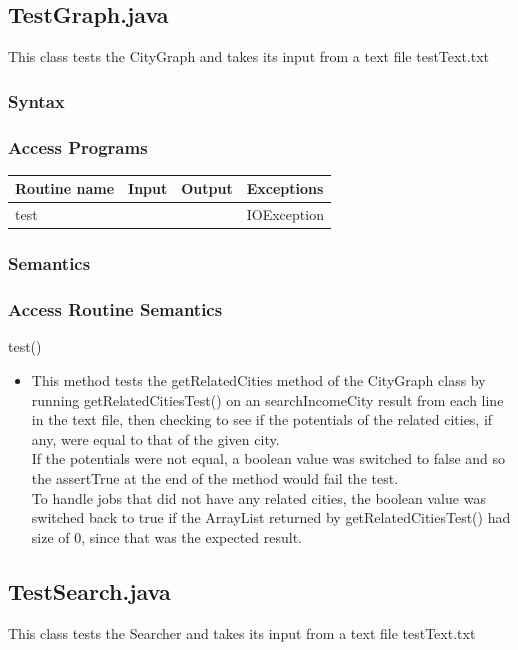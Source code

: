 \documentclass[12pt,fleqn]{article}
\begin{document}
\subsection*{TestGraph.java}\label{testg}
This class tests the CityGraph and takes its input from a text file testText.txt
\subsubsection* {Syntax}

\subsubsection* {Access Programs}
\begin{tabular}{| l | l | l | l |}
\hline
\textbf{Routine name} & \textbf{Input} & \textbf{Output} & \textbf{Exceptions}\\
\hline
test & ~ & ~ & IOException\\
\hline
\end{tabular}

\subsubsection*{Semantics}
\subsubsection*{Access Routine Semantics}
\noindent test()
\begin{itemize}
\item This method tests the getRelatedCities method of the CityGraph class by running getRelatedCitiesTest() on an searchIncomeCity result from each line in the text file, then checking to see if the potentials of the related cities, if any, were equal to that of the given city.
\\If the potentials were not equal, a boolean value was switched to false and so the assertTrue at the end of the method would fail the test.
\\To handle jobs that did not have any related cities, the boolean value was switched back to true if the ArrayList returned by getRelatedCitiesTest() had size of 0, since that was the expected result.
\end{itemize}


\subsection*{TestSearch.java}\label{tests}
This class tests the Searcher and takes its input from a text file testText.txt
\end{document}
